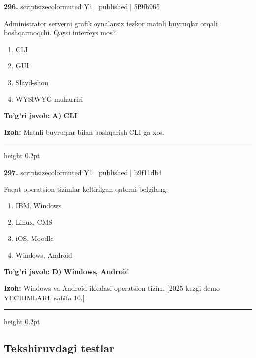 \documentclass[10pt,a4paper]{article}
\begin{document}
{\bfseries\sffamily\color{ink} 296.} {scriptsizecolor{muted} Y1 | published | 5f9fb965}
\par
Administrator serverni grafik oynalarsiz tezkor matnli buyruqlar orqali boshqarmoqchi. Qaysi interfeys mos?
\begin{enumerate}[label=\Alph*),leftmargin=9mm]
\item CLI
\item GUI
\item Slayd-shou
\item WYSIWYG muharriri
\end{enumerate}
\begin{tcolorbox}[enhanced,breakable,colback=teal!4,colframe=teal!60!black,boxrule=0.45pt,arc=1.2mm,left=2.7mm,right=2.7mm,top=1.8mm,bottom=1.8mm,before skip=2mm,after skip=2mm]
{\bfseries\sffamily\color{teal}To'g'ri javob:} \textbf{A) CLI}
\par\smallskip
{\bfseries Izoh:} Matnli buyruqlar bilan boshqarish CLI ga xos.
\end{tcolorbox}
\vspace{2mm}\hrule height 0.2pt\vspace{3mm}

{\bfseries\sffamily\color{ink} 297.} {scriptsizecolor{muted} Y1 | published | b9f11db4}
\par
Faqat operatsion tizimlar keltirilgan qatorni belgilang.
\begin{enumerate}[label=\Alph*),leftmargin=9mm]
\item IBM, Windows
\item Linux, CMS
\item iOS, Moodle
\item Windows, Android
\end{enumerate}
\begin{tcolorbox}[enhanced,breakable,colback=teal!4,colframe=teal!60!black,boxrule=0.45pt,arc=1.2mm,left=2.7mm,right=2.7mm,top=1.8mm,bottom=1.8mm,before skip=2mm,after skip=2mm]
{\bfseries\sffamily\color{teal}To'g'ri javob:} \textbf{D) Windows, Android}
\par\smallskip
{\bfseries Izoh:} Windows va Android ikkalasi operatsion tizim. [2025 kuzgi demo YECHIMLARI, sahifa 10.]
\end{tcolorbox}
\vspace{2mm}\hrule height 0.2pt\vspace{3mm}
\subsection{Tekshiruvdagi testlar}
\end{document}

